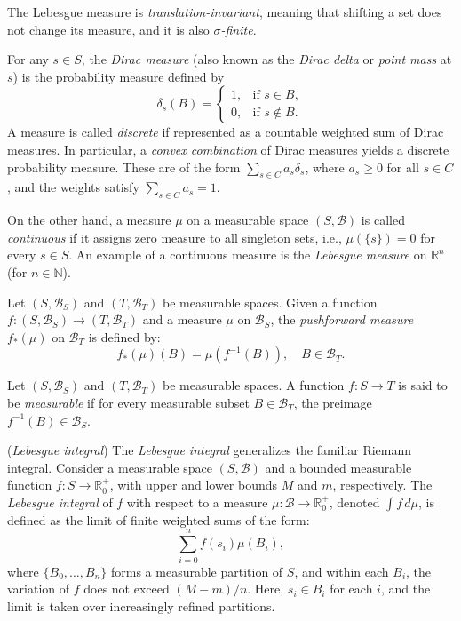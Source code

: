 The Lebesgue measure is \emph{translation-invariant}, meaning that shifting a set does not change its measure, and it is also \emph{$\sigma$-finite}.

For any $ s \in S $, the \emph{Dirac measure} (also known as the \emph{Dirac delta} or \emph{point mass} at \( s \)) is the probability measure defined by
$$
\delta_s(B) =
\begin{cases}
1, & \text{if } s \in B, \\
0, & \text{if } s \notin B.
\end{cases}
$$
A measure is called \emph{discrete} if represented as a countable weighted sum of Dirac measures. In particular, a \emph{convex combination} of Dirac measures yields a discrete probability measure. These are of the form $\sum_{s \in C} a_s \delta_s$,
where $ a_s \geq 0 $ for all $ s \in C $, and the weights satisfy $ \sum_{s \in C} a_s = 1 $.

On the other hand, a measure $ \mu $ on a measurable space $ (S, \mathcal{B}) $ is called \emph{continuous} if it assigns zero measure to all singleton sets, i.e., $ \mu(\{s\}) = 0 $ for every $ s \in S $. An example of a continuous measure is the \emph{Lebesgue measure} on $ \mathbb{R}^n $ (for $ n \in \mathbb{N} $).



\begin{definition}  \label{def:pushforward_meas_1}
  Let $(S, \mathcal{B}_S)$ and $(T, \mathcal{B}_T)$ be measurable spaces. Given a function $f: (S, \mathcal{B}_S) \to (T, \mathcal{B}_T)$ and a measure $\mu$ on $\mathcal{B}_S$, the \emph{pushforward measure} $f_*(\mu)$ on $\mathcal{B}_T$ is defined by:
$$
f_*(\mu)(B) = \mu(f^{-1}(B)), \quad  B \in \mathcal{B}_T.
$$
\end{definition}



\begin{definition}
  Let $(S, \mathcal{B}_S)$ and $(T, \mathcal{B}_T)$ be measurable spaces. A function $f: S \to T$ is said to be \emph{measurable} if for every  measurable subset  $B \in \mathcal{B}_T$, the preimage $f^{-1}(B) \in \mathcal{B}_S$.
\end{definition}


\begin{definition} (\emph{Lebesgue integral})
  The \emph{Lebesgue integral} generalizes the familiar Riemann integral. Consider a measurable space $(S, \mathcal{B})$ and a bounded measurable function $f \colon S \to \mathbb{R}_0^+$, with upper and lower bounds $M$ and $m$, respectively. The \emph{Lebesgue integral} of $f$ with respect to a measure $\mu \colon \mathcal{B} \to \mathbb{R}_0^+$, denoted $\int f \, d\mu$, is defined as the limit of finite weighted sums of the form:
$$
\sum_{i=0}^n f(s_i) \mu(B_i),
$$
where $\{B_0, \dots, B_n\}$ forms a measurable partition of $S$, and within each $B_i$, the variation of $f$ does not exceed $(M - m)/n$. Here, $s_i \in B_i$ for each $i$, and the limit is taken over increasingly refined partitions. 
\end{definition}


